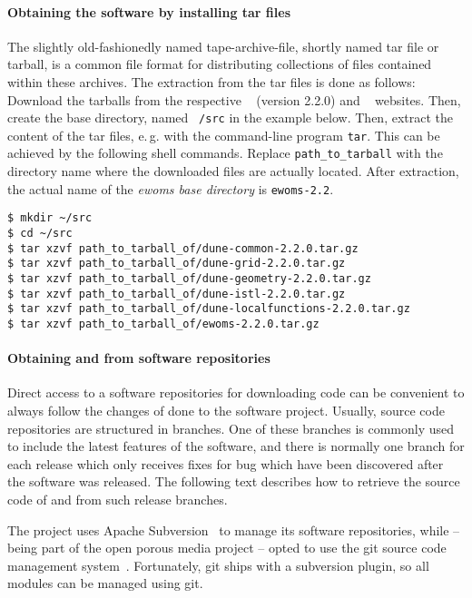 \paragraph{Obtaining the software by installing tar files}

The slightly old-fashionedly named tape-archive-file, shortly named
tar file or tarball, is a common file format for distributing
collections of files contained within these archives.  The extraction
from the tar files is done as follows: Download the tarballs from the
respective \Dune~\cite{DUNE-HP} (version 2.2.0) and
\eWoms~\cite{EWOMS-HP} websites.  Then, create the {\Dune} base
directory, named \texttt{~/src} in the example below. Then, extract the
content of the tar files, e.\,g. with the command-line program
\texttt{tar}.  This can be achieved by the following shell
commands. Replace \texttt{path\_to\_tarball} with the directory name
where the downloaded files are actually located.  After extraction,
the actual name of the \emph{ewoms base directory} is
\texttt{ewoms-2.2}.

\begin{lstlisting}[style=Bash]
$ mkdir ~/src
$ cd ~/src
$ tar xzvf path_to_tarball_of/dune-common-2.2.0.tar.gz
$ tar xzvf path_to_tarball_of/dune-grid-2.2.0.tar.gz
$ tar xzvf path_to_tarball_of/dune-geometry-2.2.0.tar.gz
$ tar xzvf path_to_tarball_of/dune-istl-2.2.0.tar.gz
$ tar xzvf path_to_tarball_of/dune-localfunctions-2.2.0.tar.gz
$ tar xzvf path_to_tarball_of/ewoms-2.2.0.tar.gz
\end{lstlisting}

\paragraph{Obtaining \Dune and \eWoms from software repositories}

Direct access to a software repositories for downloading code can be
convenient to always follow the changes of done to the software
project. Usually, source code repositories are structured in
branches. One of these branches is commonly used to include the latest
features of the software, and there is normally one branch for each
release which only receives fixes for bug which have been discovered
after the software was released. The following text describes how to
retrieve the source code of \Dune and \eWoms from such release
branches.

The \Dune project uses Apache Subversion~\cite{APACHE-SUBVERSION-HP}
to manage its software repositories, while \eWoms -- being part of the
open porous media project -- opted to use the git source code
management system~\cite{GIT-HP}. Fortunately, git ships with a
subversion plugin, so all modules can be managed using git.

